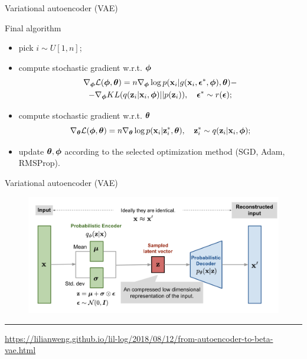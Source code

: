 \begin{frame}{Variational autoencoder (VAE)}
	\begin{block}{Final algorithm}
		\begin{itemize}
			\item pick $i \sim U[1, n]$;
			\item compute stochastic gradient w.r.t. $\boldsymbol{\phi}$
				\begin{multline*}
					\nabla_{\boldsymbol{\phi}} \mathcal{L} (\boldsymbol{\phi}, \boldsymbol{\theta}) = n \nabla_{\boldsymbol{\phi}} \log p(\mathbf{x}_i | g(\mathbf{x}_i, \boldsymbol{\epsilon}^*, \boldsymbol{\phi}), \boldsymbol{\theta}) - \\ - \nabla_{\boldsymbol{\phi}} KL (q(\mathbf{z}_i|\mathbf{x}_i, \boldsymbol{\phi}) || p(\mathbf{z}_i)), \quad \boldsymbol{\epsilon}^* \sim r(\boldsymbol{\epsilon});
				\end{multline*}
			\item compute stochastic gradient w.r.t. $\boldsymbol{\theta}$
			\[
			\nabla_{\boldsymbol{\theta}} \mathcal{L} (\boldsymbol{\phi}, \boldsymbol{\theta}) = n \nabla_{\boldsymbol{\theta}} \log p(\mathbf{x}_i|\mathbf{z}^*_i, \boldsymbol{\theta}), \quad \mathbf{z}^*_i \sim q(\mathbf{z}_i|\mathbf{x}_i, \boldsymbol{\phi});
			\]
			\item update $\boldsymbol{\theta}, \boldsymbol{\phi}$ according to the selected optimization method (SGD, Adam, RMSProp).
		\end{itemize}
	\end{block}
\end{frame}
\begin{frame}{Variational autoencoder (VAE)}

\begin{figure}[h]
	\centering
	\includegraphics[width=\linewidth]{figs/vae-gaussian.png}
\end{figure}
 \hrule\medskip
{\scriptsize \href{https://lilianweng.github.io/lil-log/2018/08/12/from-autoencoder-to-beta-vae.html}{https://lilianweng.github.io/lil-log/2018/08/12/from-autoencoder-to-beta-vae.html}}
\end{frame}
